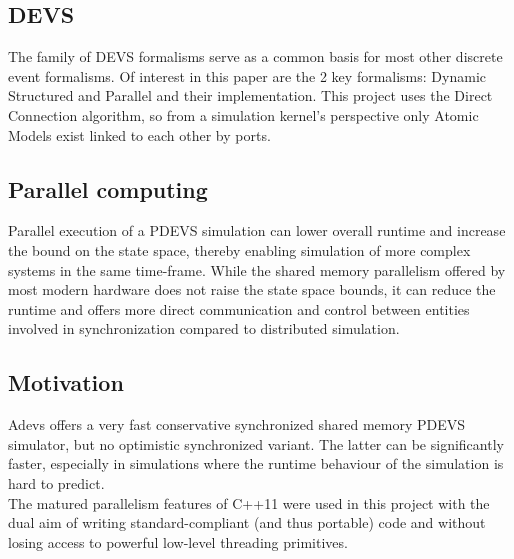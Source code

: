 \subsection{DEVS}
The family of DEVS \cite{DEVSbase} formalisms serve as a common basis for most other discrete event formalisms. Of interest in this paper are the 2 key formalisms: Dynamic Structured \cite{DSDEVS} and Parallel \cite{ParallelDEVS} and their implementation. This project uses the Direct Connection \cite{SymbolicFlattening} algorithm, so from a simulation kernel's perspective only Atomic Models exist linked to each other by ports.

\subsection{Parallel computing}
Parallel execution of a PDEVS simulation can lower overall runtime and increase the bound on the state space, thereby enabling simulation of more complex systems in the same time-frame.
While the shared memory parallelism offered by most modern hardware does not raise the state space bounds, it can reduce the runtime and offers more direct communication and control between entities involved in synchronization compared to distributed simulation. \\

\subsection{Motivation}
Adevs \cite{adevs} offers a very fast conservative synchronized shared memory PDEVS simulator, but no optimistic synchronized variant. 
The latter can be significantly faster, especially in simulations where the runtime behaviour of the simulation is hard to predict. \\
The matured parallelism features of C++11 were used in this project with the dual aim of writing standard-compliant (and thus portable) code and without losing access to powerful low-level threading primitives. %

